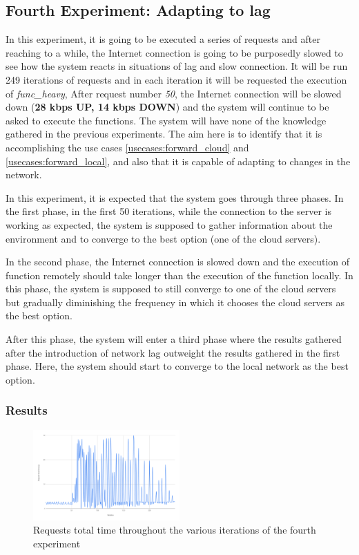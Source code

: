 \documentclass[conference]{IEEEtran}
\begin{document}
\subsection{Fourth Experiment: Adapting to lag}
\label{res:exp4}
In this experiment, it is going to be executed a series of requests and after
reaching to a while, the Internet connection is going to be purposedly slowed to
see how the system reacts in situations of lag and slow connection. It will be run
249 iterations of requests and in each iteration it will be requested the
execution of \textit{func\_heavy}, After request number \textit{50}, the Internet
connection will be slowed down (\textbf{28 kbps UP, 14 kbps DOWN}) and the system
will continue to be asked to execute the functions. The system will have none of
the knowledge gathered in the previous experiments. The aim here is to identify
that it is accomplishing the use cases \ref{usecases:forward_cloud} and
\ref{usecases:forward_local}, and also that it is capable of adapting to changes
in the network.

In this experiment, it is expected that the system goes through three phases. In
the first phase, in the first 50 iterations, while the connection to the server is
working as expected, the system is supposed to gather information about the
environment and to converge to the best option (one of the cloud servers).

In the second phase, the Internet connection is slowed down and the execution of
function remotely should take longer than the execution of the function locally.
In this phase, the system is supposed to still converge to one of the cloud
servers but gradually diminishing the frequency in which it chooses the cloud
servers as the best option.

After this phase, the system will enter a third phase where the results gathered
after the introduction of network lag outweight the results gathered in the first
phase. Here, the system should start to converge to the local network as the
best option.


\subsubsection{Results}

\begin{figure}[h]
  \begin{center}
    \includegraphics[width=0.5\textwidth]{exp4_total_time_chart.png}
    \caption{Requests total time throughout the various iterations of the
    fourth experiment }
    \label{fig:exp4_total_time_chart}
  \end{center}
\end{figure}
\end{document}
